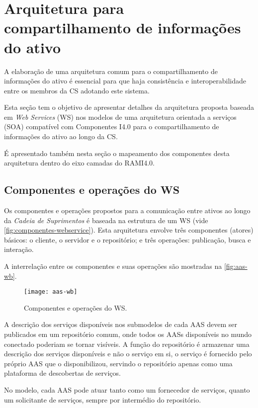 \chapter{Arquitetura para compartilhamento de informações do ativo}
	
	A elaboração de uma arquitetura comum para o compartilhamento de informações do ativo é essencial para que haja consistência e interoperabilidade entre os membros da CS adotando este sistema.
	
	Esta seção tem o objetivo de apresentar detalhes da arquitetura proposta baseada em \textit{Web Services} (WS) nos modelos de uma arquitetura orientada a serviços (SOA) compatível com Componentes I4.0 para o compartilhamento de informações do ativo ao longo da CS.
	
	É apresentado também nesta seção o mapeamento dos componentes desta arquitetura dentro do eixo camadas do RAMI4.0.
	
\section{ Componentes e operações do WS }
	
	Os componentes e operações propostos para a comunicação entre ativos ao longo da \textit{Cadeia de Suprimentos} é baseada na estrutura de um WS (vide \autoref{fig:componentes-webservice}). Esta arquitetura envolve três componentes (atores) básicos: o cliente, o servidor e o repositório; e três operações: publicação, busca e interação.
	
	A interrelação entre os componentes e suas operações são mostradas na \autoref{fig:aas-wb}.
	
	\begin{figure}[htb]
		\centering
		\caption{Componentes e operações do WS.}
		\label{fig:aas-wb}
		\texttt{[image: aas-wb]}
	\end{figure}
	
	A descrição dos serviços disponíveis nos submodelos de cada AAS devem ser publicados em um repositório comum, onde todos os AASs disponíveis no mundo conectado poderiam se tornar visíveis. A função do repositório é armazenar uma descrição dos serviços disponíveis e não o serviço em si, o serviço é fornecido pelo próprio AAS que o disponibilizou, servindo o repositório apenas como uma plataforma de descobertas de serviços.

	No modelo, cada AAS pode atuar tanto como um fornecedor de serviços, quanto um solicitante de serviços, sempre por intermédio do repositório.
	
